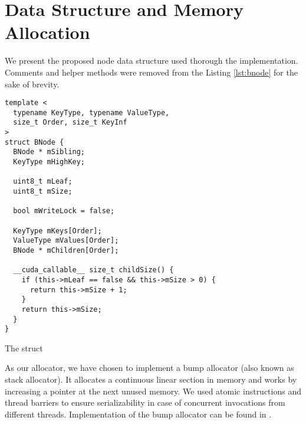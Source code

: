 \section{Data Structure and Memory Allocation}

We present the proposed node data structure used thorough the implementation. Comments and helper methods were removed from the Listing \ref{lst:bnode} for the sake of brevity.

\begin{listing}
  \begin{verbatim}
template <
  typename KeyType, typename ValueType,
  size_t Order, size_t KeyInf
>
struct BNode {
  BNode * mSibling;
  KeyType mHighKey;

  uint8_t mLeaf;
  uint8_t mSize;

  bool mWriteLock = false;

  KeyType mKeys[Order];
  ValueType mValues[Order];
  BNode * mChildren[Order]; 

  __cuda_callable__ size_t childSize() {
    if (this->mLeaf == false && this->mSize > 0) {
      return this->mSize + 1;
    }
    return this->mSize;
  }
}
    \end{verbatim}
  \caption{The  struct}\label{lst:bnode}
\end{listing}

As our allocator, we have chosen to implement a bump allocator (also known as stack allocator). It allocates a continuous linear section in memory and works by increasing a pointer at the next unused memory. We used atomic instructions and thread barriers to ensure serializability in case of concurrent invocations from different threads. Implementation of the bump allocator can be found in .

